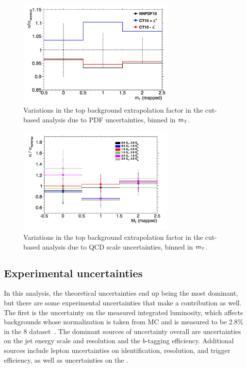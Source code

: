 \begin{figure}[h!]
  \centering
  \captionsetup{justification=centering}
  \includegraphics[width=0.7\textwidth]{figures/VBF_cb_tt_pdf}
  \caption{Variations in the top background extrapolation factor in the cut-based analysis due to PDF uncertainties, binned in $m_{\textrm{\footnotesize\sc t}}$.}
  \label{fig:vbf_tt_pdf}
\end{figure}

\begin{figure}[h!]
  \centering
  \captionsetup{justification=centering}
  \includegraphics[width=0.7\textwidth]{figures/VBF_cb_tt_qcd}
  \caption{Variations in the top background extrapolation factor in the cut-based analysis due to QCD scale uncertainties, binned in $m_{\textrm{\footnotesize\sc t}}$.}
  \label{fig:vbf_tt_qcd}
\end{figure}

\subsection{Experimental uncertainties}

In this analysis, the theoretical uncertainties end up being the most dominant, but there are some experimental uncertainties that make a contribution as well. The first is the uncertainty on the measured integrated luminosity, which affects backgrounds whose normalization is taken from MC and is measured to be 2.8\% in the 8 \TeV dataset~\cite{luminosity-paper}. The dominant sources of uncertainty overall are uncertainties on the jet energy scale and resolution and the $b$-tagging efficiency. Additional sources include lepton uncertainties on identification, resolution, and trigger efficiency, as well as uncertainties on the \met. 


